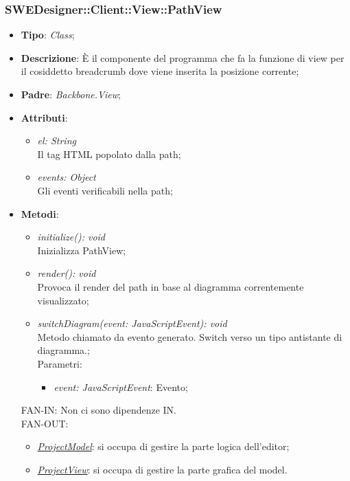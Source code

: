 \documentclass[../DefinizioneDiProdotto.tex]{subfiles}
\begin{document}
				\subsubsection{SWEDesigner::Client::View::PathView}
					\hypertarget{SWEDesigner::Client::View::PathView}{}
					\begin{itemize}
						\item \textbf{Tipo}: \emph{Class};
						\item \textbf{Descrizione}: È il componente del programma che fa la funzione di view per il cosiddetto breadcrumb dove viene inserita la posizione corrente;
						\item \textbf{Padre}: \emph{Backbone.View};
						\item \textbf{Attributi}:
						\begin{itemize}
							\item \emph{el: String} \\
							Il tag HTML popolato dalla path;
							\item \emph{events: Object} \\
							Gli eventi verificabili nella path;
						\end{itemize}
						\item \textbf{Metodi}:
						\begin{itemize}
							\item \emph{initialize(): void} \\
							Inizializza PathView; 
							\item \emph{render(): void} \\
							Provoca il render del path in base al diagramma correntemente visualizzato; 
							\item \emph{switchDiagram(event: JavaScriptEvent): void} \\
							Metodo chiamato da evento generato. Switch verso un tipo antistante di diagramma.; \\
							Parametri:
							\begin{itemize}
								\item \emph{event: JavaScriptEvent}: Evento;
							\end{itemize}
						\end{itemize}
						FAN-IN:
						Non ci sono dipendenze IN. \\
						FAN-OUT:
						\begin{itemize}
							\item \hyperlink{SWEDesigner::Model::ProjectModel}{\emph{ProjectModel}}: si occupa di gestire la parte logica dell'editor;
							\item \hyperlink{SWEDesigner::View::ProjectView}{\emph{ProjectView}}: si occupa di gestire la parte grafica del model.
						\end{itemize}
					\end{itemize}
\end{document}
